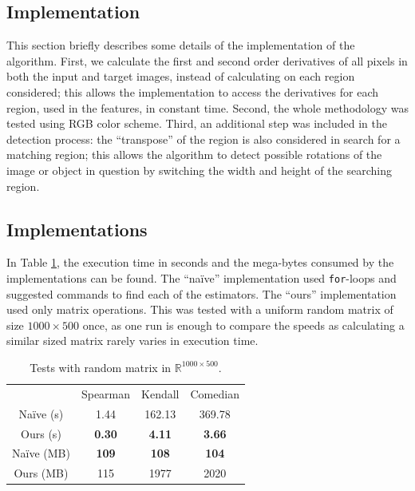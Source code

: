 \documentclass[11pt]{article}
\theoremstyle{definition}
\theoremstyle{remark}
\theoremstyle{remark}
\theoremstyle{remark}
\newcommand{\R}{{\mathbb{R}}}
\begin{document}
\subsection{Implementation}
This section briefly describes some details of the implementation of the algorithm. First, we calculate the first and second order derivatives of all pixels in both the input and target images, instead of calculating on each region considered; this allows the implementation to access the derivatives for each region, used in the features, in constant time. Second, the whole methodology was tested using RGB color scheme. Third, an additional step was included in the detection process: the ``transpose'' of the region is also considered in search for a matching region; this allows the algorithm to detect possible rotations of the image or object in question by switching the width and height of the searching region.

\subsection{Implementations}
In Table \ref{tab:times}, the execution time in seconds and the mega-bytes consumed by the implementations can be found. The ``naïve'' implementation used \texttt{for}-loops and suggested commands to find each of the estimators. The ``ours'' implementation used only matrix operations. This was tested with a uniform random matrix of size $1000\times 500$ once, as one run is enough to compare the speeds as calculating a similar sized matrix rarely varies in execution time.
%
\begin{table}[H]
    \centering
    \begin{tabular}{cccc}
        \hline
                   & Spearman      & Kendall       & Comedian      \\
        Na\"ive (s)  & 1.44          & 162.13        & 369.78        \\
        Ours (s)   & \textbf{0.30} & \textbf{4.11} & \textbf{3.66} \\
        Na\"ive (MB) & \textbf{109}  & \textbf{108}  & \textbf{104}  \\ 
        Ours (MB)  & 115           & 1977          & 2020    \\     \hline
    \end{tabular}
    \caption{Tests with random matrix in $\R^{1000\times500}$.}
    \label{tab:times}
\end{table}
\end{document}
